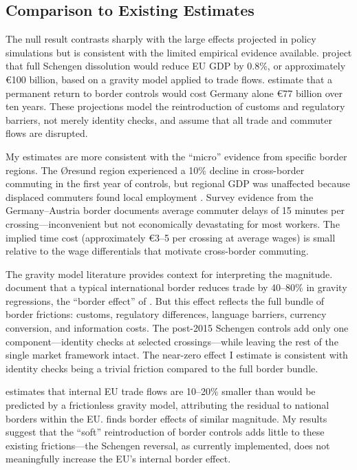 \documentclass[12pt]{article}
\begin{document}
\subsection{Comparison to Existing Estimates}

The null result contrasts sharply with the large effects projected in policy simulations but is consistent with the limited empirical evidence available. \cite{Aussilloux2016} project that full Schengen dissolution would reduce EU GDP by 0.8\%, or approximately \euro{}100 billion, based on a gravity model applied to trade flows. \cite{Boehmer2016} estimate that a permanent return to border controls would cost Germany alone \euro{}77 billion over ten years. These projections model the reintroduction of customs and regulatory barriers, not merely identity checks, and assume that all trade and commuter flows are disrupted.

My estimates are more consistent with the ``micro'' evidence from specific border regions. The \O resund region experienced a 10\% decline in cross-border commuting in the first year of controls, but regional GDP was unaffected because displaced commuters found local employment \citep{OvermanPuga2002}. Survey evidence from the Germany--Austria border documents average commuter delays of 15 minutes per crossing---inconvenient but not economically devastating for most workers. The implied time cost (approximately \euro{}3--5 per crossing at average wages) is small relative to the wage differentials that motivate cross-border commuting.

The gravity model literature provides context for interpreting the magnitude. \cite{HeadMayer2014} document that a typical international border reduces trade by 40--80\% in gravity regressions, the ``border effect'' of \cite{McCallum1995}. But this effect reflects the full bundle of border frictions: customs, regulatory differences, language barriers, currency conversion, and information costs. The post-2015 Schengen controls add only one component---identity checks at selected crossings---while leaving the rest of the single market framework intact. The near-zero effect I estimate is consistent with identity checks being a trivial friction compared to the full border bundle.

\cite{Chen2004} estimates that internal EU trade flows are 10--20\% smaller than would be predicted by a frictionless gravity model, attributing the residual to national borders within the EU. \cite{Nitsch2000} finds border effects of similar magnitude. My results suggest that the ``soft'' reintroduction of border controls adds little to these existing frictions---the Schengen reversal, as currently implemented, does not meaningfully increase the EU's internal border effect.
\end{document}
